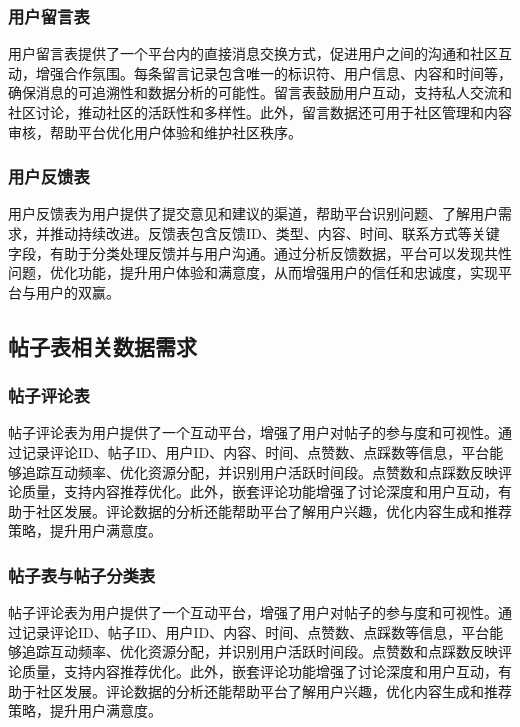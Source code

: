 \subsubsection{用户留言表}

用户留言表提供了一个平台内的直接消息交换方式，促进用户之间的沟通和社区互动，增强合作氛围。每条留言记录包含唯一的标识符、用户信息、内容和时间等，确保消息的可追溯性和数据分析的可能性。留言表鼓励用户互动，支持私人交流和社区讨论，推动社区的活跃性和多样性。此外，留言数据还可用于社区管理和内容审核，帮助平台优化用户体验和维护社区秩序。

\subsubsection{用户反馈表}

用户反馈表为用户提供了提交意见和建议的渠道，帮助平台识别问题、了解用户需求，并推动持续改进。反馈表包含反馈ID、类型、内容、时间、联系方式等关键字段，有助于分类处理反馈并与用户沟通。通过分析反馈数据，平台可以发现共性问题，优化功能，提升用户体验和满意度，从而增强用户的信任和忠诚度，实现平台与用户的双赢。

\subsection{帖子表相关数据需求}

\subsubsection{帖子评论表}

帖子评论表为用户提供了一个互动平台，增强了用户对帖子的参与度和可视性。通过记录评论ID、帖子ID、用户ID、内容、时间、点赞数、点踩数等信息，平台能够追踪互动频率、优化资源分配，并识别用户活跃时间段。点赞数和点踩数反映评论质量，支持内容推荐优化。此外，嵌套评论功能增强了讨论深度和用户互动，有助于社区发展。评论数据的分析还能帮助平台了解用户兴趣，优化内容生成和推荐策略，提升用户满意度。

\subsubsection{帖子表与帖子分类表}

帖子评论表为用户提供了一个互动平台，增强了用户对帖子的参与度和可视性。通过记录评论ID、帖子ID、用户ID、内容、时间、点赞数、点踩数等信息，平台能够追踪互动频率、优化资源分配，并识别用户活跃时间段。点赞数和点踩数反映评论质量，支持内容推荐优化。此外，嵌套评论功能增强了讨论深度和用户互动，有助于社区发展。评论数据的分析还能帮助平台了解用户兴趣，优化内容生成和推荐策略，提升用户满意度。

